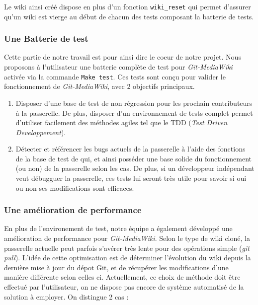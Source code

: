 \documentclass[11pt]{article}
\begin{document}
Le wiki ainsi créé dispose en plus d'un fonction 
\lstinline!wiki_reset! qui permet d'assurer qu'un wiki est vierge
au début de chacun des tests composant la batterie de tests.

\subsubsection{Une Batterie de test}

Cette partie de notre travail est pour ainsi dire le coeur 
de notre projet. Nous proposons à l'utilisateur une batterie complète
de test pour \textit{Git-MediaWiki} activée via la commande 
\lstinline!Make test!. Ces tests sont conçu pour valider le 
fonctionnement de \textit{Git-MediaWiki}, avec 2 objectifs principaux.

\begin{enumerate}
\item Disposer d'une base de test de non régression pour les prochain 
  contributeurs à la passerelle. De plus, disposer d'un environnement de 
  tests complet permet d'utiliser facilement des méthodes agiles tel que
  le TDD (\textit{Test Driven Developpement}). \\
\item Détecter et référencer les bugs actuels de la passerelle à l'aide
  des fonctions de la base de test de qui, et ainsi posséder une base 
  solide du fonctionnement (ou non) de la passerelle selon les cas. De
  plus, si un développeur indépendant veut débugguer la passerelle, ces 
  tests lui seront très utile pour savoir si oui ou non ses modifications
  sont efficaces.
\end{enumerate}

\subsubsection{Une amélioration de performance}

En plus de l'environement de test, notre équipe a également développé 
une amélioration de performance pour \textit{Git-MediaWiki}. Selon le
type de wiki cloné, la passerelle actuelle peut parfois s'avérer très
lente pour des opérations simple (\textit{git pull}). L'idée de cette
optimisation est de déterminer l'évolution du wiki depuis la dernière
mise à jour du dépot Git, et de récupérer les modifications d'une 
manière différente selon celles ci. Actuellement, ce choix de méthode
doit être effectué par l'utilisateur, on ne dispose pas encore de
système automatisé de la solution à employer.  On distingue 2 cas :
\end{document}
